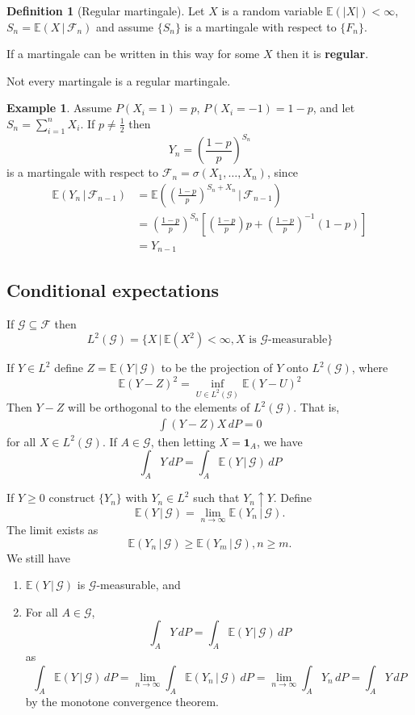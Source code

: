 \documentclass[10pt, oneside, reqno]{amsart}
\theoremstyle{plain}%
\theoremstyle{definition}
\newtheorem{defn}[thm]{Definition}
\newtheorem{exmp}[thm]{Example}
\theoremstyle{remark}
\newcommand{\given}{ \, | \,}
\newcommand{\sigf}{\mathcal{F}}
\newcommand{\E}{\mathbb{E}}
\newcommand{\sigg}{\mathcal{G}}
\begin{document}
\begin{defn}[Regular martingale]
	Let $X$ is a random variable $\E(|X|) < \infty$, $S_n = \E(X \, | \, \sigf_n)$ and assume $\{ S_n \}$ is a martingale with respect to $\{ F_n \}$.  
	
	If a martingale can be written in this way for some $X$ then it is \textbf{regular}.  
\end{defn}

Not every martingale is a regular martingale.  

\begin{exmp}
	Assume $P(X_i = 1) = p$, $P(X_i = -1) = 1-p$, and let $S_n = \sum_{i=1}^n X_i$.  If $p \neq \frac{1}{2}$ then \[
		Y_n = \left( \frac{1-p}{p} \right)^{S_n}
	\] is a martingale with respect to $\sigf_n = \sigma(X_1, \dots,X_n)$, since \begin{align*}
		\E(Y_n \, | \, \sigf_{n-1}) &= \E\left(\left( \frac{1-p}{p} \right)^{S_n + X_n} \, | \, \sigf_{n-1} \right) \\
		&= \left( \frac{1-p}{p} \right)^{S_n} \left[\left( \frac{1-p}{p} \right) p + \left(\frac{1-p}{p} \right)^{-1}(1-p) \right] \\
		&= Y_{n-1}
	\end{align*}
\end{exmp}

\subsection{Conditional expectations} %
\label{sub:conditional_expectations}
If $\sigg \subseteq \sigf$ then \[
	L^2(\sigg) = \{ X \, | \, \E(X^2) < \infty, \text{$X$ is $\sigg$-measurable} \}
\]

If $Y \in L^2$ define $Z = \E(Y \given \sigg)$ to be the projection of $Y$ onto $L^2(\sigg)$, where \[
	\E(Y-Z)^2 = \inf_{U \in L^2(\sigg)} \E(Y - U)^2
\] Then $Y-Z$ will be orthogonal to the elements of $L^2(\sigg)$.  That is, \begin{align*}
	\int (Y-Z) X \, dP = 0 
\end{align*} for all $X \in L^2(\sigg)$.  If $A \in \sigg$, then letting $X = \mathbf{1}_{A}$, we have \[ \boxed{
	\int_A Y \, dP = \int_A \E(Y \given \sigg) \, dP
}
\]

If $Y \geq 0$ construct $\{ Y_n \}$ with $Y_n \in L^2$ such that $Y_n \uparrow Y$.  Define \[
	\E(Y \given \sigg) = \lim_{n \rightarrow \infty} \E(Y_n \given \sigg).
\] The limit exists as \[
	\E(Y_n \given \sigg) \geq \E(Y_m \given \sigg), n \geq m.
\]  We still have 
\begin{enumerate}[(1)]

	\item $\E(Y \given \sigg)$ is $\sigg$-measurable, and 
	\item For all $A \in \sigg$, \[
		\int_A Y \, dP = \int_A \E(Y \given \sigg) \, dP
	\] as \[
		\int_A \E(Y \given \sigg) \, dP= \lim_{n \rightarrow \infty} \int_A \E(Y_n \given \sigg) \, dP = \lim_{n \rightarrow \infty} \int_A Y_n \, dP  = \int_A Y \, dP
	\] by the monotone convergence theorem.  
\end{enumerate}
\end{document}
